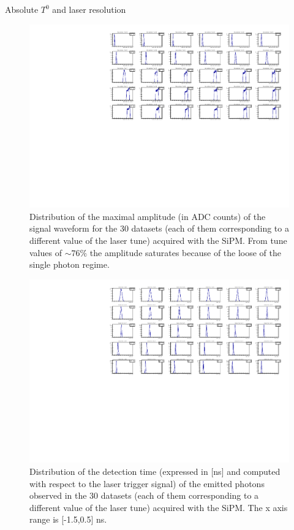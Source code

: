 \documentclass[a4paper,11pt]{article}
\begin{document}
\begin{subsection}{Absolute $T^0$ and laser resolution}
\begin{figure}
\begin{center}
\includegraphics[scale=0.8]{plots/SiPM_ampdistr}
\caption{Distribution of the maximal amplitude (in ADC counts) of the signal waveform for the 30 datasets (each of them corresponding to a different value of the laser tune) acquired with the SiPM. From tune values of $\sim 76\%$ the amplitude saturates because of the loose of the single photon regime.}
\label{fig:SiPM_tune_scan_amp}
\end{center}
\end{figure}

\begin{figure}
\begin{center}
\includegraphics[scale=0.8]{plots/SiPM_Tdistr}
\caption{Distribution of the detection time (expressed in [ns] and computed with respect to the laser trigger signal) of the emitted photons observed in the 30 datasets (each of them corresponding to a different value of the laser tune) acquired with the SiPM. The x axis range is [-1.5,0.5] ns.}
\label{fig:SiPM_tune_scan_T}
\end{center}
\end{figure}



\end{subsection}
\end{document}
